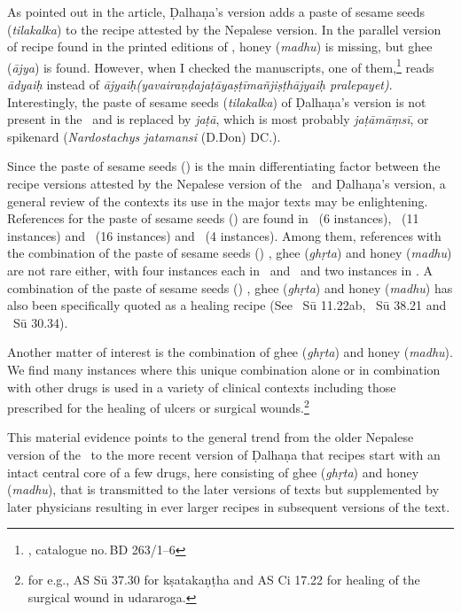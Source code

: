 As pointed out in the article, Ḍalhaṇa’s version adds a paste of sesame seeds
(\emph{tilakalka}) to the recipe attested by the Nepalese version. In the parallel
version of recipe found in the printed editions of \AS, honey (\emph{madhu}) is
missing, but ghee (\emph{ājya}) is found. However, when I checked the manuscripts,
one of them,\footnote{, catalogue no.\,BD 
263/1--6} reads \emph{ādyaiḥ} instead of
\emph{ājyaiḥ(yavairaṇḍajaṭāyaṣṭīmañjiṣṭhājyaiḥ pralepayet)}. Interestingly, the 
paste of sesame seeds (\emph{tilakalka}) of Ḍalhaṇa’s version is not present in the
\AS\ and is replaced by \emph{jaṭā}, which is most probably \emph{jaṭāmāṃsī}, or
spikenard (\emph{Nardostachys jatamansi} (D.Don) DC.).

Since the  paste of sesame seeds ()  is the main differentiating
factor between the recipe versions attested by the Nepalese version of the \SS\
and Ḍalhaṇa’s version, a general review of the contexts its use in the major texts
may be enlightening. References for the  paste of sesame seeds (\dev{tilakalka})
are found in \CS\ (6 instances), \SS\ (11 instances) and \AS\ (16 instances) and
\AHS\ (4 instances). Among them, references with the combination of the  paste of
sesame seeds (\dev{tilakalka}) , ghee (\emph{ghṛta}) and honey (\emph{madhu}) are
not rare either, with four instances each in \SS\ and \AS\ and two instances in
\AHS. A combination of the  paste of sesame seeds (\dev{tilakalka}) , ghee
(\emph{ghṛta}) and honey (\emph{madhu}) has also been specifically quoted as a
healing recipe (See \SS\ Sū 11.22ab, \AS\ Sū 38.21 and \AHS\ Sū 30.34).

Another matter of interest is the combination of ghee (\emph{ghṛta}) and honey
(\emph{madhu}). We find many instances where this unique combination alone or in
combination with other drugs is used in a variety of clinical contexts including
those prescribed for the healing of ulcers or surgical wounds.\footnote{for e.g.,
    AS Sū 37.30 for kṣatakaṇṭha and AS Ci 17.22 for healing of the surgical wound in
    udararoga.}

This material evidence points to the general trend from the older Nepalese version
of the \SS\ to the more recent version of Ḍalhaṇa that recipes start with an
intact central core of a few drugs, here consisting of ghee (\emph{ghṛta}) and
honey (\emph{madhu}), that is transmitted to the later versions of texts but
supplemented by later physicians resulting in ever larger recipes in subsequent
versions of the text.

